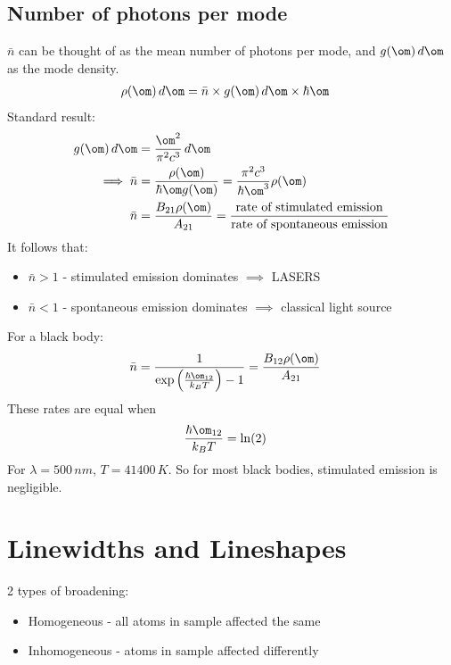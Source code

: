\documentclass[a4paper, 11pt, normalem]{report}
\begin{document}
\section{Number of photons per mode}
$\bar{n}$ can be thought of as the mean number of photons per mode, and $g(\om)\,d\om$ as the mode density. 
\begin{align}
    \rho(\om)\,d\om &= \bar{n} \times g(\om)\,d\om \times \hbar\om
\end{align}
Standard result:
\begin{align}
    g(\om)\,d\om &= \frac{\om^2}{\pi^2c^3}\,d\om \\
    \implies \bar{n} &= \frac{\rho(\om)}{\hbar\om g(\om)} = \frac{\pi^2c^3}{\hbar\om^3}\rho(\om)\\
    \bar{n} &= \frac{B_{21}\rho(\om)}{A_{21}} = \frac{\text{rate of stimulated emission}}{\text{rate of spontaneous emission}}
\end{align}
It follows that:
\begin{itemize}
    \item $\bar{n}>1$ - stimulated emission dominates $\implies$ LASERS
    \item $\bar{n}<1$ - spontaneous emission dominates $\implies$ classical light source
\end{itemize}
For a black body:
\begin{align}
    \bar{n} &= \frac{1}{\exp\left(\frac{\hbar\om_{12}}{k_BT}\right) -1} = \frac{B_{12}\rho(\om)}{A_{21}}
\end{align}
These rates are equal when
\begin{align}
    \frac{\hbar\om_{12}}{k_BT} &= \ln(2)
\end{align}
For $\lambda=500\,nm$, $T= 41400\,K$. So for most black bodies, stimulated emission is negligible.

\chapter{Linewidths and Lineshapes}
2 types of broadening:
\begin{itemize}
    \item Homogeneous - all atoms in sample affected the same
    \item Inhomogeneous - atoms in sample affected differently
\end{itemize}
\end{document}
